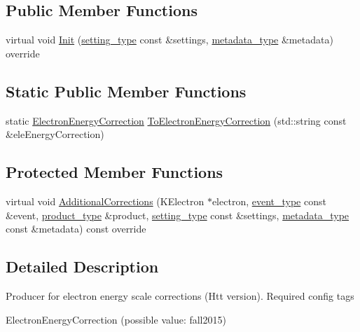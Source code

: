 \subsection*{Public Member Functions}
\begin{DoxyCompactItemize}
\item 
virtual void \hyperlink{classHttElectronCorrectionsProducer_a23e30f4e831c2be5cef1c9968fee70e0}{Init} (\hyperlink{classHttElectronCorrectionsProducer_a7e0458045a229bf4cdb7dbdc488078be}{setting\_\-type} const \&settings, \hyperlink{classHttElectronCorrectionsProducer_a956e67f1c2b74330fe6da6e5dad3eb50}{metadata\_\-type} \&metadata) override
\end{DoxyCompactItemize}
\subsection*{Static Public Member Functions}
\begin{DoxyCompactItemize}
\item 
static \hyperlink{classHttElectronCorrectionsProducer_a4a9df688e889b0c00043b901eecaac4c}{ElectronEnergyCorrection} \hyperlink{classHttElectronCorrectionsProducer_a29ad3cf007efb99ee413fccdfb1896a6}{ToElectronEnergyCorrection} (std::string const \&eleEnergyCorrection)
\end{DoxyCompactItemize}
\subsection*{Protected Member Functions}
\begin{DoxyCompactItemize}
\item 
virtual void \hyperlink{classHttElectronCorrectionsProducer_a9de2dd4eaa7676e68e9c67ff9616a9f2}{AdditionalCorrections} (KElectron $\ast$electron, \hyperlink{classHttElectronCorrectionsProducer_a7972baeb26d5c7003099092fe30db215}{event\_\-type} const \&event, \hyperlink{classHttElectronCorrectionsProducer_a3e393b3f94ee4c60d6bbb9bc5fb33416}{product\_\-type} \&product, \hyperlink{classHttElectronCorrectionsProducer_a7e0458045a229bf4cdb7dbdc488078be}{setting\_\-type} const \&settings, \hyperlink{classHttElectronCorrectionsProducer_a956e67f1c2b74330fe6da6e5dad3eb50}{metadata\_\-type} const \&metadata) const override
\end{DoxyCompactItemize}


\subsection{Detailed Description}
Producer for electron energy scale corrections (Htt version). Required config tags
\begin{DoxyItemize}
\item ElectronEnergyCorrection (possible value: fall2015) 
\end{DoxyItemize}


